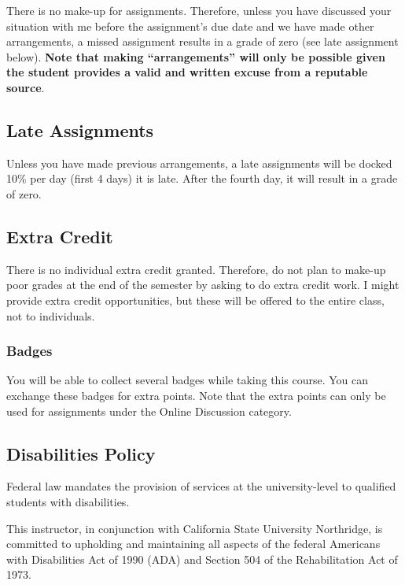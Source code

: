 \documentclass[11pt,]{article}
\begin{document}
There is no make-up for assignments. Therefore, unless you have
discussed your situation with me before the assignment's due date and we
have made other arrangements, a missed assignment results in a grade of
zero (see late assignment below). \textbf{Note that making
``arrangements'' will only be possible given the student provides a
valid and written excuse from a reputable source}.

\hypertarget{late-assignments}{%
\subsection{Late Assignments}\label{late-assignments}}

Unless you have made previous arrangements, a late assignments will be
docked 10\% per day (first 4 days) it is late. After the fourth day, it
will result in a grade of zero.

\hypertarget{extra-credit}{%
\subsection{Extra Credit}\label{extra-credit}}

There is no individual extra credit granted. Therefore, do not plan to
make-up poor grades at the end of the semester by asking to do extra
credit work. I might provide extra credit opportunities, but these will
be offered to the entire class, not to individuals.

\hypertarget{badges}{%
\subsubsection{Badges}\label{badges}}

You will be able to collect several badges while taking this course. You
can exchange these badges for extra points. Note that the extra points
can only be used for assignments under the Online Discussion category.

\hypertarget{disabilities-policy}{%
\subsection{Disabilities Policy}\label{disabilities-policy}}

Federal law mandates the provision of services at the university-level
to qualified students with disabilities.

This instructor, in conjunction with California State University
Northridge, is committed to upholding and maintaining all aspects of the
federal Americans with Disabilities Act of 1990 (ADA) and Section 504 of
the Rehabilitation Act of 1973.
\end{document}
